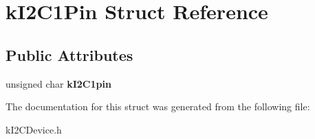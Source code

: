 \hypertarget{structkI2C1Pin}{}\section{k\+I2\+C1\+Pin Struct Reference}
\label{structkI2C1Pin}
\subsection*{Public Attributes}
\begin{DoxyCompactItemize}
\item 
unsigned char {\bfseries k\+I2\+C1pin}\hypertarget{structkI2C1Pin_abae5bc275d80ea00f33ec2af9c79d255}{}\label{structkI2C1Pin_abae5bc275d80ea00f33ec2af9c79d255}

\end{DoxyCompactItemize}


The documentation for this struct was generated from the following file\+:\begin{DoxyCompactItemize}
\item 
k\+I2\+C\+Device.\+h\end{DoxyCompactItemize}
